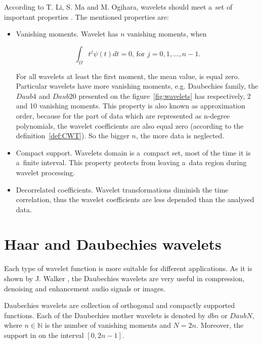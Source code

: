 According to T. Li, S. Ma and M. Ogihara, wavelets should meet a~set of important properties \cite{WaveletMethodsInDataMining}. The mentioned properties are:

\begin{itemize}
\item Vanishing moments. Wavelet has $n$ vanishing moments, when

\begin{equation}
\int_\Omega t^j \psi(t) dt=0 \text{, for } j=0,1,\ldots,n-1.
\end{equation}

For all wavelets at least the first moment, the mean value, is equal zero. Particular wavelets have more vanishing moments, e.g. Daubechies family, the $Daub4$ and $Daub20$ presented on the figure~\ref{fig:wavelets} has respectively, 2 and 10 vanishing moments. This property is also known as approximation order, because for the part of data which are represented as n-degree polynomials, the wavelet coefficients are also equal zero (according to the definition~\ref{def:CWT}). So the bigger $n$, the more data is neglected.

\item Compact support. Wavelets domain is a~compact set, most of the time it is a~finite interval. This property protects from leaving a~data region during wavelet processing.

\item Decorrelated coefficients. Wavelet transformations diminish the time correlation, thus the wavelet coefficients are less depended than the analysed data.
\end{itemize}


\section{Haar and Daubechies wavelets}

Each type of wavelet function is more suitable for different applications. As it is shown by J. Walker \cite{APrimerOnWavelets}, the Daubechies wavelets are very useful in compression, denoising and enhancement audio signals or images.

\begin{defn}
Daubechies wavelets are collection of orthogonal and compactly supported functions. Each of the Daubechies mother wavelets is denoted by $dbn$ or $DaubN$, where $n\in\mathbb{N}$ is the number of vanishing moments and $N=2n$. Moreover, the support in on the interval $[0, 2n-1]$.
\end{defn}

